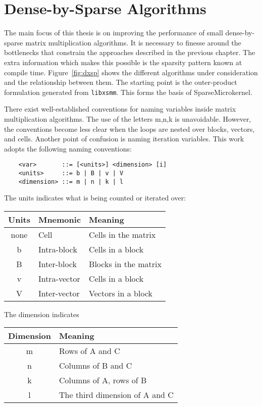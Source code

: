 \chapter{Dense-by-Sparse Algorithms}
\label{chapter:algs}

The main focus of this thesis is on improving the performance of small dense-by-sparse matrix multiplication algorithms. It is necessary to finesse around the bottlenecks that constrain the approaches described in the previous chapter. The extra information which makes this possible is the sparsity pattern known at compile time. Figure~\ref{fig:dxsp} shows the different algorithms under consideration and the relationship between them. The starting point is the outer-product formulation generated from \texttt{libxsmm}. This forms the basis of SparseMicrokernel. 

There exist well-established conventions for naming variables inside matrix multiplication algorithms. 
The use of the letters m,n,k is unavoidable. However, the conventions become less clear when the loops are nested over blocks, vectors, and cells.
Another point of confusion is naming iteration variables. This work adopts the following naming conventions:

  \begin{verbatim} 
    <var>       ::= [<units>] <dimension> [i]
    <units>     ::= b | B | v | V
    <dimension> ::= m | n | k | l
  \end{verbatim}

The units indicates what is being counted or iterated over:

    \begin{tabular}{cll}
\toprule
Units    & Mnemonic & Meaning \\
\midrule

none  & Cell          & Cells in the matrix      \\
b     & Intra-block   & Cells in a block         \\
B     & Inter-block   & Blocks in the matrix     \\
v     & Intra-vector  & Cells in a block         \\
V     & Inter-vector  & Vectors in a block       \\
\bottomrule
\end{tabular}

The dimension indicates 

\begin{tabular}{cl}
\toprule
Dimension    & Meaning \\
\midrule
m & Rows of A and C \\
n & Columns of B and C \\
k & Columns of A, rows of B \\
l & The third dimension of A and C\\
\bottomrule
\end{tabular}


